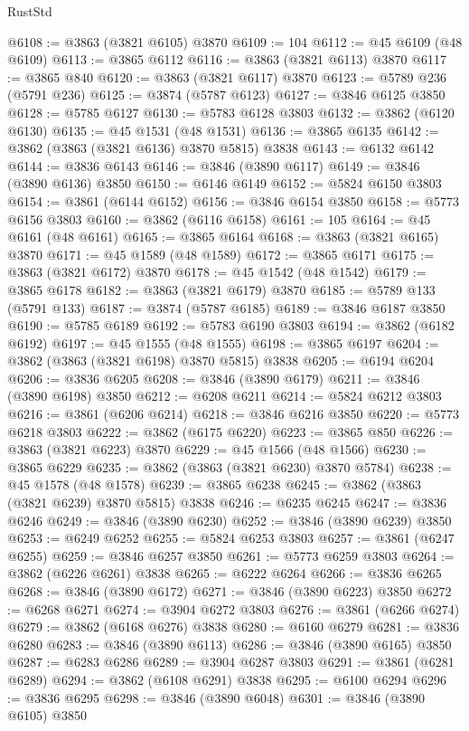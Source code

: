 \begin{lexlean}{RustStd}
\begin{coremodule}
@6108 := @3863 (@3821 @6105) @3870
@6109 := 104
@6112 := @45 @6109 (@48 @6109)
@6113 := @3865 @6112
@6116 := @3863 (@3821 @6113) @3870
@6117 := @3865 @840
@6120 := @3863 (@3821 @6117) @3870
@6123 := @5789 @236 (@5791 @236)
@6125 := @3874 (@5787 @6123)
@6127 := @3846 @6125 @3850
@6128 := @5785 @6127
@6130 := @5783 @6128 @3803
@6132 := @3862 (@6120 @6130)
@6135 := @45 @1531 (@48 @1531)
@6136 := @3865 @6135
@6142 := @3862 (@3863 (@3821 @6136) @3870 @5815) @3838
@6143 := @6132 @6142
@6144 := @3836 @6143
@6146 := @3846 (@3890 @6117)
@6149 := @3846 (@3890 @6136) @3850
@6150 := @6146 @6149
@6152 := @5824 @6150 @3803
@6154 := @3861 (@6144 @6152)
@6156 := @3846 @6154 @3850
@6158 := @5773 @6156 @3803
@6160 := @3862 (@6116 @6158)
@6161 := 105
@6164 := @45 @6161 (@48 @6161)
@6165 := @3865 @6164
@6168 := @3863 (@3821 @6165) @3870
@6171 := @45 @1589 (@48 @1589)
@6172 := @3865 @6171
@6175 := @3863 (@3821 @6172) @3870
@6178 := @45 @1542 (@48 @1542)
@6179 := @3865 @6178
@6182 := @3863 (@3821 @6179) @3870
@6185 := @5789 @133 (@5791 @133)
@6187 := @3874 (@5787 @6185)
@6189 := @3846 @6187 @3850
@6190 := @5785 @6189
@6192 := @5783 @6190 @3803
@6194 := @3862 (@6182 @6192)
@6197 := @45 @1555 (@48 @1555)
@6198 := @3865 @6197
@6204 := @3862 (@3863 (@3821 @6198) @3870 @5815) @3838
@6205 := @6194 @6204
@6206 := @3836 @6205
@6208 := @3846 (@3890 @6179)
@6211 := @3846 (@3890 @6198) @3850
@6212 := @6208 @6211
@6214 := @5824 @6212 @3803
@6216 := @3861 (@6206 @6214)
@6218 := @3846 @6216 @3850
@6220 := @5773 @6218 @3803
@6222 := @3862 (@6175 @6220)
@6223 := @3865 @850
@6226 := @3863 (@3821 @6223) @3870
@6229 := @45 @1566 (@48 @1566)
@6230 := @3865 @6229
@6235 := @3862 (@3863 (@3821 @6230) @3870 @5784)
@6238 := @45 @1578 (@48 @1578)
@6239 := @3865 @6238
@6245 := @3862 (@3863 (@3821 @6239) @3870 @5815) @3838
@6246 := @6235 @6245
@6247 := @3836 @6246
@6249 := @3846 (@3890 @6230)
@6252 := @3846 (@3890 @6239) @3850
@6253 := @6249 @6252
@6255 := @5824 @6253 @3803
@6257 := @3861 (@6247 @6255)
@6259 := @3846 @6257 @3850
@6261 := @5773 @6259 @3803
@6264 := @3862 (@6226 @6261) @3838
@6265 := @6222 @6264
@6266 := @3836 @6265
@6268 := @3846 (@3890 @6172)
@6271 := @3846 (@3890 @6223) @3850
@6272 := @6268 @6271
@6274 := @3904 @6272 @3803
@6276 := @3861 (@6266 @6274)
@6279 := @3862 (@6168 @6276) @3838
@6280 := @6160 @6279
@6281 := @3836 @6280
@6283 := @3846 (@3890 @6113)
@6286 := @3846 (@3890 @6165) @3850
@6287 := @6283 @6286
@6289 := @3904 @6287 @3803
@6291 := @3861 (@6281 @6289)
@6294 := @3862 (@6108 @6291) @3838
@6295 := @6100 @6294
@6296 := @3836 @6295
@6298 := @3846 (@3890 @6048)
@6301 := @3846 (@3890 @6105) @3850

\end{coremodule}
\end{lexlean}
